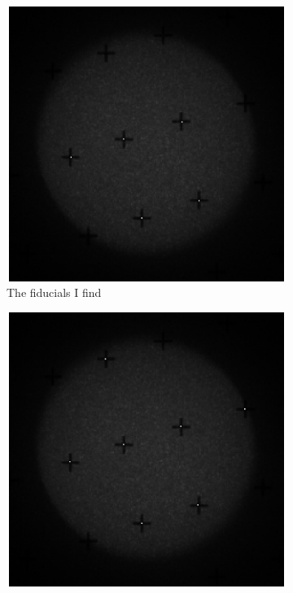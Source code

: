 \documentclass[10pt]{scrartcl}
\begin{document}
\begin{figure} [!ht]
    \centering
    \hspace{-1.0in}
    \begin{subfigure}[b]{.45\linewidth}
        \centering
        \includegraphics[width=1.3\textwidth]{../plots_tables_images/myfid.eps}
        \caption{The fiducials I find}
    \end{subfigure}
    \hspace{.5in}
    \begin{subfigure}[b]{.45\linewidth}
        \centering
        \includegraphics[width=1.3\textwidth]{../plots_tables_images/albfid.eps}

\end{subfigure}
\end{figure}
\end{document}
